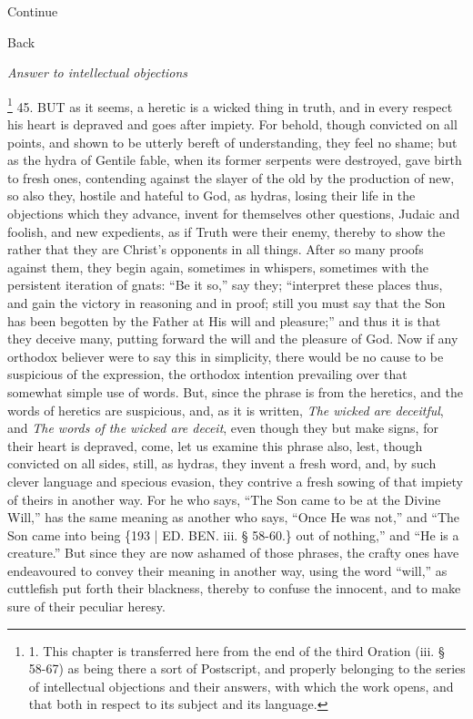 Continue


Back

\emph{Answer
to intellectual objections}

\footnote{

1. This chapter is transferred
here from the end of the third Oration (iii. § 58-67) as being there
a sort of Postscript, and properly belonging to the series of
intellectual objections and their answers, with which the work opens,
and that both in respect to its subject and its language.} 45. BUT
as it seems, a heretic is a wicked thing in truth, and in every
respect his heart is depraved and goes after impiety. For
behold, though convicted on all points, and shown to be utterly bereft
of understanding, they feel no shame; but as the hydra of Gentile
fable, when its former serpents were destroyed, gave birth to fresh
ones, contending against the slayer of the old by the production of
new, so also they, hostile and hateful to God, as hydras, losing their
life in the objections which they advance, invent for themselves other
questions, Judaic and foolish, and new expedients, as if Truth were
their enemy, thereby to show the rather that they are Christ's
opponents in all things. After so many proofs against them, they begin
again, sometimes in whispers, sometimes with the persistent iteration
of gnats: ``Be it so,'' say they; ``interpret these places thus, and gain
the victory in reasoning and in proof; still you must say that the Son
has been begotten by the Father at His will and pleasure;'' and
thus it is that they deceive many, putting forward the will and the
pleasure of God. Now if any orthodox believer were to say this in
simplicity, there would be no cause to be suspicious of the
expression, the orthodox intention prevailing over that somewhat
simple use of words. But, since the phrase is from the heretics, and
the words of heretics are suspicious, and, as it is written, \emph{The
wicked are deceitful}, and \emph{The words of the wicked are deceit},
even though they but make signs, for their heart is depraved, come,
let us examine this phrase also, lest, though convicted on all sides,
still, as hydras, they invent a fresh word, and, by such clever
language and specious evasion, they contrive a fresh sowing of that
impiety of theirs in another way. For he who says, ``The Son came to be
at the Divine Will,'' has the same meaning as another who says, ``Once
He was not,'' and ``The Son came into being \{193 | ED. BEN.
iii. § 58-60.\} out of nothing,'' and ``He is a creature.'' But since
they are now ashamed of those phrases, the crafty ones have
endeavoured to convey their meaning in another way, using the word ``will,''
as cuttlefish put forth their blackness, thereby to confuse the
innocent, and to make sure of their peculiar heresy.

